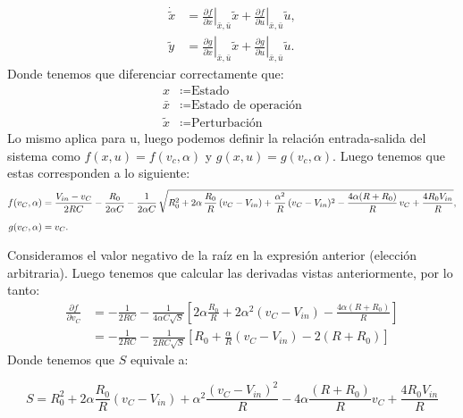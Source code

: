 \documentclass[
  11pt,
  letterpaper,
   addpoints,
   answers
  ]{exam}
\begin{document}
\begin{questions}
\begin{solution}
\begin{align}
\dot{\tilde{x}} &= 
\left.\frac{\partial f}{\partial x}\right|_{\bar{x},\bar{u}} \tilde{x} 
+ \left.\frac{\partial f}{\partial u}\right|_{\bar{x},\bar{u}} \tilde{u}, \\[6pt]
\tilde{y} &= 
\left.\frac{\partial g}{\partial x}\right|_{\bar{x},\bar{u}} \tilde{x} 
+ \left.\frac{\partial g}{\partial u}\right|_{\bar{x},\bar{u}} \tilde{u}.
\end{align}
Donde tenemos que diferenciar correctamente que:
\begin{align}
    x &\coloneqq \text{Estado}\\
    \bar{x} &\coloneqq \text{Estado de operación}\\
    \tilde{x} &\coloneqq \text{Perturbación}
\end{align} 
Lo mismo aplica para u, luego podemos definir la relación entrada-salida del sistema como $f(x,u) = f(v_{c},\alpha)$ y $g(x,u) = g(v_{c},\alpha)$. Luego tenemos que estas corresponden a lo siguiente:
{\small
\begin{align}
f(v_C,\alpha)
&= \frac{V_{in}-v_C}{2RC}
   - \frac{R_0}{2\alpha C}
   - \frac{1}{2\alpha C}\,\sqrt{%
        R_0^2
        + 2\alpha\,\frac{R_0}{R}\,(v_C - V_{in})
        + \frac{\alpha^2}{R}\,(v_C - V_{in})^2
        - \frac{4\alpha (R+R_0)}{R}\,v_C
        + \frac{4R_0 V_{in}}{R}
     }, \\[6pt]
g(v_C,\alpha) &= v_C.
\end{align}
}


Consideramos el valor negativo de la raíz en la expresión anterior (elección arbitraria). Luego tenemos que calcular las derivadas vistas anteriormente, por lo tanto:
\begin{align}
\frac{\partial f}{\partial v_C} 
&= -\frac{1}{2RC} 
   - \frac{1}{4 \alpha C \sqrt{S}}
      \left[ 
        2 \alpha \frac{R_0}{R} 
        + 2 \alpha^2 (v_C - V_{in}) 
        - \frac{4 \alpha (R+R_0)}{R} 
      \right] \\[6pt]
&= -\frac{1}{2RC} 
   - \frac{1}{2RC \sqrt{S}}
      \left[ 
        R_0 + \frac{\alpha}{R}(v_C - V_{in}) - 2(R+R_0) 
      \right]
\end{align}
Donde tenemos que $S$ equivale a:

\begin{equation}
S = R_0^2 + 2\alpha \frac{R_0}{R} (v_C - V_{in}) + \alpha^2 \frac{(v_C - V_{in})^2}{R} - 4\alpha \frac{(R + R_0)}{R} v_C + \frac{4R_0 V_{in}}{R}
\end{equation}


\end{solution}
\end{questions}
\end{document}
